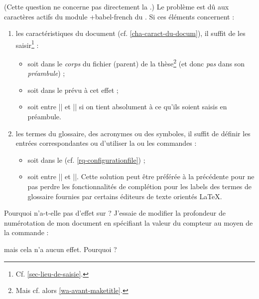 (Cette question ne concerne pas directement la \yatCl{}.) Le problème
est dû aux caractères actifs du module \package*+{babel-french} du
. Si ces éléments concernent :
\begin{enumerate}
\item les caractéristiques du document (cf. \vref{cha-caract-du-docum}), il
  suffit de les saisir\footnote{Cf. \vref{sec-lieu-de-saisie}.} :
  \begin{itemize}
  \item soit dans le \emph{corps} du fichier (parent) de la thèse\footnote{Mais
      cf. alors \vref{wa-avant-maketitle}.} (et donc \emph{pas} dans son
    \emph{préambule}) ;
  \item soit dans le \File{\characteristicsfile} prévu à cet effet ;
  \item soit entre || et || si on tient
    absolument à ce qu'ils soient saisis en préambule.
  \end{itemize}
\item les termes du glossaire, des acronymes ou des symboles, il suffit de
  définir les entrées correspondantes ou d'utiliser la ou les commandes
   :
  \begin{itemize}
  \item soit dans le \File{\configurationfile}
    (cf. \vref{rq-configurationfile}) ;
  \item soit entre || et ||. Cette solution
    peut être préférée à la précédente pour ne pas perdre les fonctionnalités de
    complétion pour les labels des termes de glossaire fournies par certains
    éditeurs de texte orientés \LaTeX{}.
  \end{itemize}
\end{enumerate}

\begin{dbfaq}{Pourquoi \protect{} n'a-t-elle pas
    d'effet sur \protect{} ?}{}
  J'essaie de modifier la profondeur de numérotation de mon document en
  spécifiant la valeur du compteur  au moyen de la
  commande :
\begin{preamblecode}
\end{preamblecode}
  mais cela n'a aucun effet. Pourquoi ?
\end{dbfaq}

